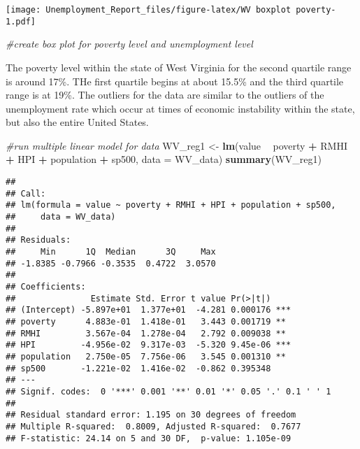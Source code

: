 \documentclass[
]{article}
\newenvironment{Shaded}{\begin{snugshade}}{\end{snugshade}}
\newcommand{\CommentTok}[1]{\textcolor[rgb]{0.56,0.35,0.01}{\textit{#1}}}
\newcommand{\DataTypeTok}[1]{\textcolor[rgb]{0.13,0.29,0.53}{#1}}
\newcommand{\KeywordTok}[1]{\textcolor[rgb]{0.13,0.29,0.53}{\textbf{#1}}}
\newcommand{\NormalTok}[1]{#1}
\newcommand{\OperatorTok}[1]{\textcolor[rgb]{0.81,0.36,0.00}{\textbf{#1}}}
\newcommand{\StringTok}[1]{\textcolor[rgb]{0.31,0.60,0.02}{#1}}
\begin{document}
\texttt{[image: Unemployment\_Report\_files/figure-latex/WV boxplot poverty-1.pdf]}

\begin{Shaded}
\begin{Highlighting}[]
\CommentTok{#create box plot for poverty level and unemployment level}
\end{Highlighting}
\end{Shaded}

The poverty level within the state of West Virginia for the second
quartile range is around 17\%. THe first quartile begins at about 15.5\%
and the third quartile range is at 19\%. The outliers for the data are
similar to the outliers of the unemployment rate which occur at times of
economic instability within the state, but also the entire United
States.

\begin{Shaded}
\begin{Highlighting}[]
\CommentTok{#run multiple linear model for data}
\NormalTok{WV_reg1 <-}\StringTok{ }\KeywordTok{lm}\NormalTok{(value }\OperatorTok{~}\StringTok{ }\NormalTok{poverty }\OperatorTok{+}\StringTok{ }\NormalTok{RMHI }\OperatorTok{+}\StringTok{ }\NormalTok{HPI }\OperatorTok{+}\StringTok{ }\NormalTok{population }\OperatorTok{+}\StringTok{ }\NormalTok{sp500, }\DataTypeTok{data =}\NormalTok{ WV_data)}
\KeywordTok{summary}\NormalTok{(WV_reg1)}
\end{Highlighting}
\end{Shaded}

\begin{verbatim}
## 
## Call:
## lm(formula = value ~ poverty + RMHI + HPI + population + sp500, 
##     data = WV_data)
## 
## Residuals:
##     Min      1Q  Median      3Q     Max 
## -1.8385 -0.7966 -0.3535  0.4722  3.0570 
## 
## Coefficients:
##               Estimate Std. Error t value Pr(>|t|)    
## (Intercept) -5.897e+01  1.377e+01  -4.281 0.000176 ***
## poverty      4.883e-01  1.418e-01   3.443 0.001719 ** 
## RMHI         3.567e-04  1.278e-04   2.792 0.009038 ** 
## HPI         -4.956e-02  9.317e-03  -5.320 9.45e-06 ***
## population   2.750e-05  7.756e-06   3.545 0.001310 ** 
## sp500       -1.221e-02  1.416e-02  -0.862 0.395348    
## ---
## Signif. codes:  0 '***' 0.001 '**' 0.01 '*' 0.05 '.' 0.1 ' ' 1
## 
## Residual standard error: 1.195 on 30 degrees of freedom
## Multiple R-squared:  0.8009, Adjusted R-squared:  0.7677 
## F-statistic: 24.14 on 5 and 30 DF,  p-value: 1.105e-09
\end{verbatim}
\end{document}
